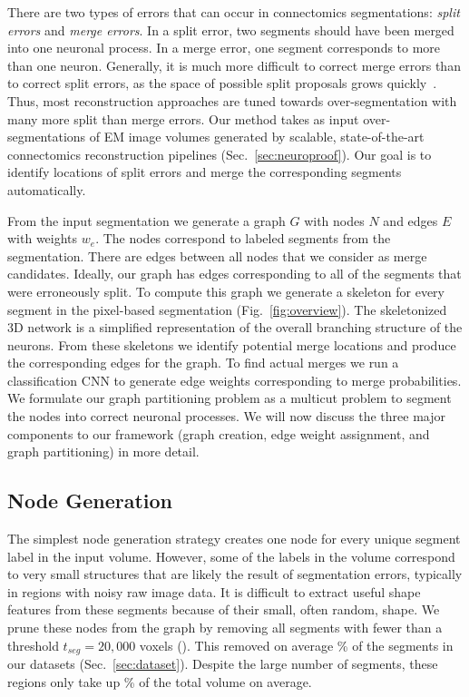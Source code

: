 There are two types of errors that can occur in connectomics segmentations: \textit{split errors} and \textit{merge errors}. 
In a split error, two segments should have been merged into one neuronal process. 
In a merge error, one segment corresponds to more than one neuron.
Generally, it is much more difficult to correct merge errors than to correct split errors,
as the space of possible split proposals grows quickly~\cite{parag2015properties}.
Thus, most reconstruction approaches are tuned towards over-segmentation with many more split than merge errors. 
Our method takes as input over-segmentations of EM image volumes generated by scalable, state-of-the-art connectomics reconstruction pipelines (Sec.~\ref{sec:neuroproof}). 
Our goal is to identify locations of split errors and merge the corresponding segments automatically.

From the input segmentation we generate a graph $G$ with nodes $N$ and edges $E$ with weights $w_e$. 
The nodes correspond to labeled segments from the segmentation.
There are edges between all nodes that we consider as merge candidates.
Ideally, our graph has edges corresponding to all of the segments that were erroneously split. 
To compute this graph we generate a skeleton for every segment in the pixel-based segmentation (Fig.~\ref{fig:overview}). 
The skeletonized 3D network is a simplified representation of the overall branching structure of the neurons. 
From these skeletons we identify potential merge locations and produce the corresponding edges for the graph. 
To find actual merges we run a classification CNN to generate edge weights corresponding to merge probabilities.
We formulate our graph partitioning problem as a multicut problem to segment the nodes into correct neuronal processes. 
We will now discuss the three major components to our framework (graph creation, edge weight assignment, and graph partitioning) in more detail.

\subsection{Node Generation}
\label{sec:skeletonization}

The simplest node generation strategy creates one node for every unique segment label in the input volume. 
However, some of the labels in the volume correspond to very small structures that are likely the result of segmentation errors, typically in regions with noisy raw image data. 
It is difficult to extract useful shape features from these segments because of their small, often random, shape. 
We prune these nodes from the graph by removing all segments with fewer than a threshold $t_{seg} = 20,000$ voxels (). 
This removed on average \% of the segments in our  datasets (Sec.~\ref{sec:dataset}). Despite the large number of segments, these regions only take up \% of the total volume on average.

